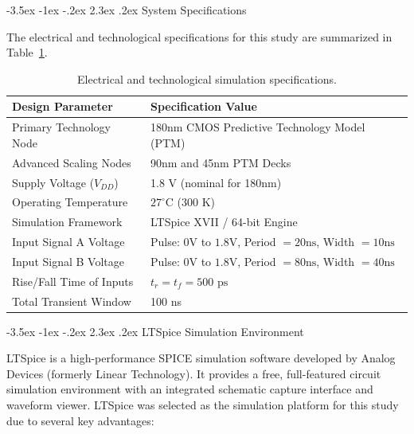 \documentclass[12pt,a4paper,oneside]{report}
\makeatletter
\renewcommand\section{\@startsection {section}{1}{\z@}%
                                   {-3.5ex \@plus -1ex \@minus -.2ex}%
                                   {2.3ex \@plus.2ex}%
                                   {\normalfont\normalsize\bfseries}}
\makeatother
\begin{document}
\section{System Specifications}

The electrical and technological specifications for this study are summarized in Table~\ref{tab:meth_specs}.

\begin{table}[H]
\centering
\caption{Electrical and technological simulation specifications.}
\label{tab:meth_specs}
\vspace{0.2cm}
\begin{tabular}{|l|l|}
\hline
\textbf{Design Parameter} & \textbf{Specification Value} \\
\hline
Primary Technology Node & 180nm CMOS Predictive Technology Model (PTM) \\
\hline
Advanced Scaling Nodes & 90nm and 45nm PTM Decks \\
\hline
Supply Voltage ($V_{DD}$) & 1.8 V (nominal for 180nm) \\
\hline
Operating Temperature & $27^\circ\text{C}$ (300 K) \\
\hline
Simulation Framework & LTSpice XVII / 64-bit Engine \\
\hline
Input Signal A Voltage & Pulse: $0\text{V}$ to $1.8\text{V}$, Period $= 20\text{ns}$, Width $= 10\text{ns}$ \\
\hline
Input Signal B Voltage & Pulse: $0\text{V}$ to $1.8\text{V}$, Period $= 80\text{ns}$, Width $= 40\text{ns}$ \\
\hline
Rise/Fall Time of Inputs & $t_r = t_f = 500\text{ ps}$ \\
\hline
Total Transient Window & 100 ns \\
\hline
\end{tabular}
\end{table}

\section{LTSpice Simulation Environment}

LTSpice is a high-performance SPICE simulation software developed by Analog Devices (formerly Linear Technology). It provides a free, full-featured circuit simulation environment with an integrated schematic capture interface and waveform viewer. LTSpice was selected as the simulation platform for this study due to several key advantages:
\end{document}
